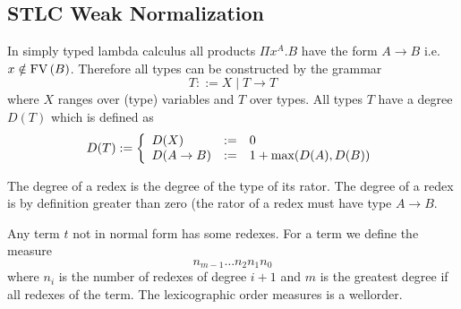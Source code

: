 \subsection{STLC Weak Normalization}


In simply typed lambda calculus all products $\Pi x^A. B$ have the form $A \to
B$ i.e. $x \notin \text{FV}\,(B)$. Therefore all types can be constructed by the grammar
$$
T ::= X \mid T \to T
$$
where $X$ ranges over (type) variables and $T$ over types. All types $T$ have a
degree $D(T)$ which is defined as
$$
D(T) := \left\{ \begin{array}{llll} 
    D(X) &:=& 0
    \\
    D(A \to B) &:=& 1 + \text{max}(D(A), D(B))
 \end{array} \right.
$$

The degree of a redex is the degree of the type of its rator. The degree of a
redex is by definition greater than zero (the rator of a redex must have type $A
\to B$.


Any term $t$ not in normal form has some redexes. For a term we define the
measure
$$
n_{m-1} \ldots n_2 n_1 n_0
$$
where $n_i$ is the number of redexes of degree $i+1$ and $m$ is the greatest
degree if all redexes of the term. The lexicographic order measures is a
wellorder.

